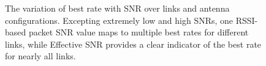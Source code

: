 \begin{figure}[ht]
	\vspace{-8pt}
	\hspace{0.14\columnwidth}%
	\caption{\label{fig:snr_rate_steps}The variation of best rate with SNR over links and antenna configurations. Excepting extremely low and high SNRs, one RSSI-based packet SNR value maps to multiple best rates for different links, %
while Effective SNR provides a clear indicator of the best rate for nearly all links.}
\vspace{-3pt}
\end{figure}

